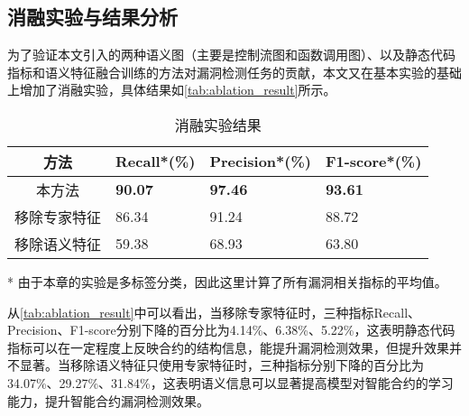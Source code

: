 \subsection{消融实验与结果分析}
\label{sec:消融实验与结果分析}
为了验证本文引入的两种语义图（主要是控制流图和函数调用图）、以及静态代码指标和语义特征融合训练的方法对漏洞检测任务的贡献，本文又在基本实验的基础上增加了消融实验，具体结果如\autoref{tab:ablation_result}所示。
\begin{table}[htbp]
    \caption{\label{tab:ablation_result}消融实验结果}
    \small
    \begin{threeparttable}{
    \renewcommand{\arraystretch}{1.5}
    \begin{tabularx}{\linewidth}{cX<{\centering}X<{\centering}X<{\centering}}
        \hline
        方法 & Recall*(\%) & Precision*(\%) & F1-score*(\%) \\
        \hline
        本方法 & \textbf{90.07} & \textbf{97.46} & \textbf{93.61} \\
        移除专家特征 & 86.34 & 91.24 & 88.72 \\
        移除语义特征 & 59.38 & 68.93 & 63.80 \\
        \hline
    \end{tabularx}
    }
    \begin{tablenotes}
        \footnotesize
        \item[*] 由于本章的实验是多标签分类，因此这里计算了所有漏洞相关指标的平均值。
    \end{tablenotes}
\end{threeparttable}
\end{table}
从\autoref{tab:ablation_result}中可以看出，当移除专家特征时，三种指标Recall、Precision、F1-score分别下降的百分比为4.14\%、6.38\%、5.22\%，这表明静态代码指标可以在一定程度上反映合约的结构信息，能提升漏洞检测效果，但提升效果并不显著。当移除语义特征只使用专家特征时，三种指标分别下降的百分比为34.07\%、29.27\%、31.84\%，这表明语义信息可以显著提高模型对智能合约的学习能力，提升智能合约漏洞检测效果。




